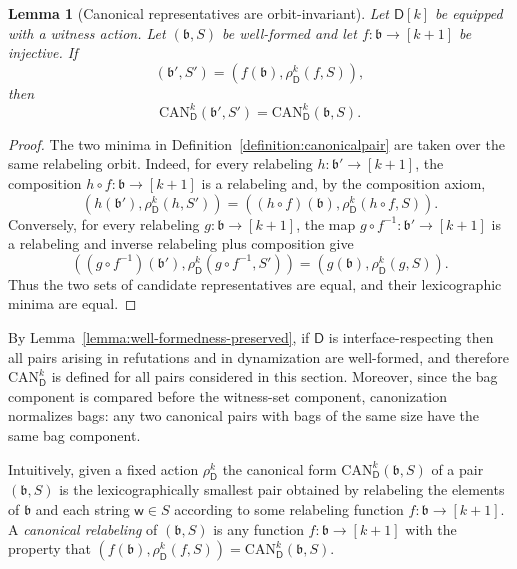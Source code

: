 \documentclass[11pt,a4paper]{article}
\newtheorem{lemma}[theorem]{Lemma}
\newcommand{\treewidthvalue}{k}
\newcommand{\abag}{\mathfrak{b}}
\newcommand{\awitness}{\mathsf{w}}
\newcommand{\dpcore}{\mathsf{D}}
\newcommand{\witnessset}{S}
\newcommand{\relabelingfunction}{f}
\newcommand{\action}{\rho}
\newcommand{\canonic}{\mathrm{CAN}}
\begin{document}
\begin{lemma}[Canonical representatives are orbit-invariant]
\label{lemma:canonical-orbit-invariant}
Let $\dpcore[\treewidthvalue]$ be equipped with a witness action. Let $(\abag,\witnessset)$ be well-formed and let $f:\abag\to[\treewidthvalue+1]$ be injective. If
\[
(\abag',\witnessset')=(f(\abag),\action_{\dpcore}^{\treewidthvalue}(f,\witnessset)),
\]
then
\[
\canonic_{\dpcore}^k(\abag',\witnessset')
=
\canonic_{\dpcore}^k(\abag,\witnessset).
\]
\end{lemma}
\begin{proof}
The two minima in Definition~\ref{definition:canonicalpair} are taken over the same relabeling orbit. Indeed, for every relabeling $h:\abag'\to[\treewidthvalue+1]$, the composition $h\circ f:\abag\to[\treewidthvalue+1]$ is a relabeling and, by the composition axiom,
\[
(h(\abag'),\action_{\dpcore}^{\treewidthvalue}(h,\witnessset'))
=
((h\circ f)(\abag),\action_{\dpcore}^{\treewidthvalue}(h\circ f,\witnessset)).
\]
Conversely, for every relabeling $g:\abag\to[\treewidthvalue+1]$, the map $g\circ f^{-1}:\abag'\to[\treewidthvalue+1]$ is a relabeling and inverse relabeling plus composition give
\[
((g\circ f^{-1})(\abag'),\action_{\dpcore}^{\treewidthvalue}(g\circ f^{-1},\witnessset'))
=
(g(\abag),\action_{\dpcore}^{\treewidthvalue}(g,\witnessset)).
\]
Thus the two sets of candidate representatives are equal, and their lexicographic minima are equal.
\end{proof}

By Lemma~\ref{lemma:well-formedness-preserved}, if $\dpcore$ is interface-respecting then all pairs arising in refutations and in dynamization are well-formed, and therefore $\canonic_{\dpcore}^k$ is defined for all pairs considered in this section. Moreover, since the bag component is compared before the witness-set component, canonization normalizes bags: any two canonical pairs with bags of the same size have the same bag component.

Intuitively, given a fixed action $\action_{\dpcore}^{\treewidthvalue}$ the canonical form
$\canonic_{\dpcore}^k(\abag,\witnessset)$
of a pair $(\abag,\witnessset)$ is the lexicographically smallest pair obtained by relabeling the elements of $\abag$ and each string $\awitness\in \witnessset$ according to some relabeling function $\relabelingfunction:\abag\rightarrow [\treewidthvalue+1]$. A \emph{canonical relabeling} of $(\abag,\witnessset)$ is any function $\relabelingfunction:\abag\rightarrow [\treewidthvalue +1]$
with the property that $(\relabelingfunction(\abag),\action_{\dpcore}^{\treewidthvalue}(\relabelingfunction,\witnessset))  = \canonic_{\dpcore}^k(\abag,\witnessset)$.
\end{document}
